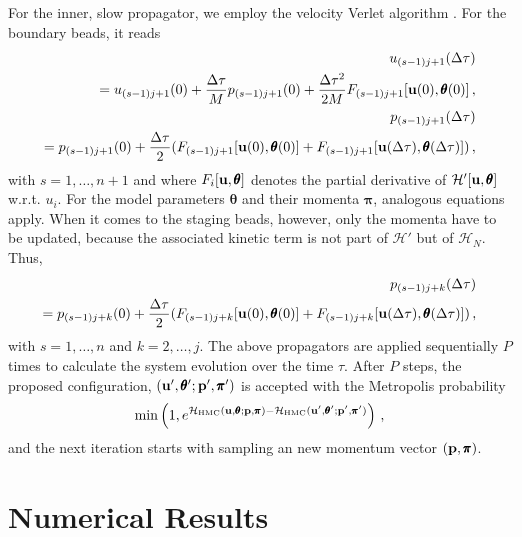 \documentclass[12pt,a4paper,final]{iopart}
\newcommand{\bt}{\pmb\theta}
\newcommand{\vc}[1]{{\bf #1 }}
\begin{document}
For the inner, slow propagator, we employ the velocity Verlet algorithm \cite{swope_1982_verlet}.
For the boundary beads, it reads
\begin{eqnarray}
  u_{(s-1)j+1}(\Delta\tau) \nonumber \\
  = u_{(s-1)j+1}(0)
  +
  \frac{\Delta\tau}{M} p_{(s-1)j+1}(0)
  +
  \frac{\Delta \tau^2}{2M}
  F_{(s-1)j+1}[\vc u(0),{\pmb\theta}(0)]\,,\\
  p_{(s-1)j+1}(\Delta\tau) \nonumber \\
  = p_{(s-1)j+1}(0)
  +
  \frac{\Delta\tau}{2}
  (
  F_{(s-1)j+1}[\vc u(0),{\pmb\theta}(0)]
  +
  F_{(s-1)j+1}[\vc u(\Delta\tau),{\pmb\theta}(\Delta\tau)]
  )\,,
\end{eqnarray}
with $s=1,\dots,n+1$ and where $F_i[\vc u,{\pmb\theta}]$ denotes the partial derivative of $\mathcal H'[\vc u,{\pmb\theta}]$ w.r.t. $u_i$.
For the model parameters $\bt$ and their momenta ${\pmb\pi}$, analogous equations apply.
When it comes to the staging beads, however, only the momenta have to be updated, because the associated kinetic term is not part of $\mathcal H'$ but of $\mathcal H_N$.
Thus,
\begin{eqnarray}
  p_{(s-1)j+k}(\Delta\tau) \nonumber \\
  =
  p_{(s-1)j+k}(0)
  +
  \frac{\Delta\tau}{2}
  (
  F_{(s-1)j+k}[\vc u(0),{\pmb\theta}(0)]
  +
  F_{(s-1)j+k}[\vc u(\Delta\tau),{\pmb\theta}(\Delta\tau)]
  )
  \,,
\end{eqnarray}
with $s=1,\dots,n$ and $k=2,\dots,j$. The above propagators are applied sequentially $P$ times to calculate the system evolution over the time $\tau$.
After $P$ steps, the proposed configuration, $(\vc u',\bt';\vc p',{\pmb\pi}')$ is accepted with the Metropolis probability
\begin{equation}
  \min
  \left(
    1,
    e^{\mathcal{H}_{\mbox{\tiny HMC}}(\vc u,\bt;\vc p,{\pmb\pi}) - \mathcal{H}_{\mbox{\tiny HMC}}(\vc u',\bt';\vc p',{\pmb\pi}')}
  \right)\,,
\end{equation}
and the next iteration starts with sampling an new momentum vector $(\vc p,{\pmb\pi})$.

\section{Numerical Results}\label{numerical_results}
\end{document}
